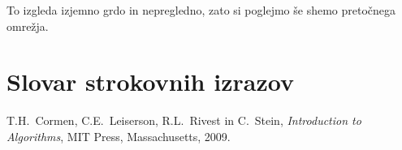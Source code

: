 \documentclass[mat1]{fmfdelo}
\begin{document}
To izgleda izjemno grdo in nepregledno, zato si poglejmo še shemo pretočnega omrežja.
























\newpage


\section*{Slovar strokovnih izrazov}

\geslo{}{}
\geslo{}{}


\begin{thebibliography}{99}

T.H.~Cormen, C.E.~Leiserson, R.L.~Rivest in C.~Stein, \emph{Introduction to Algorithms}, MIT Press, Massachusetts, 2009.

\end{thebibliography}
\end{document}
